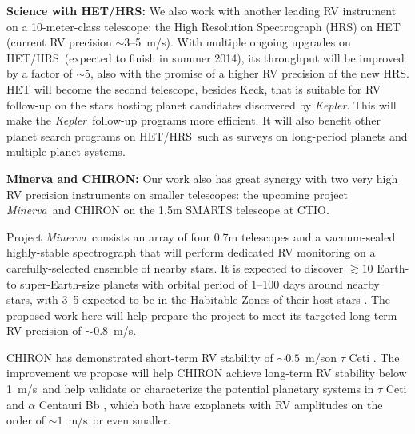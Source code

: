 \documentclass[12pt]{article}
\def\mps{m/s}
\def\kepler{{\it Kepler}}
\def\minerva{{\it Minerva}}
\def\hrs{HET/HRS}
\begin{document}
\textbf{Science with \hrs: } We also work with another leading RV
instrument on a 10-meter-class telescope: the High Resolution
Spectrograph (HRS) on HET (current RV precision $\sim$3--5~\mps). With
multiple ongoing upgrades on \hrs\ (expected to finish in summer
2014), its throughput will be improved by a factor of $\sim$5, also
with the promise of a higher RV precision of the new HRS. HET will
become the second telescope, besides Keck, that is suitable for RV
follow-up on the stars hosting planet candidates discovered by
\kepler. This will make the \kepler\ follow-up programs more
efficient. It will also benefit other planet search programs on
\hrs\ such as surveys on long-period planets and multiple-planet
systems.

\textbf{Minerva and CHIRON: } Our work also has great synergy with two
very high RV precision instruments on smaller telescopes: the upcoming
project \minerva\ and CHIRON on
the 1.5m SMARTS telescope at CTIO. 

Project \minerva\ consists an array of four 0.7m telescopes and a
vacuum-sealed highly-stable spectrograph that will perform dedicated
RV monitoring on a carefully-selected ensemble of nearby stars. It is
expected to discover $\gtrsim 10$ Earth- to super-Earth-size planets
with orbital period of 1--100 days around nearby stars, with 3--5
expected to be in the Habitable Zones of their host stars
\citep{bottom2013,hogstrom2013}. The proposed work here will help
prepare the project to meet its targeted long-term RV precision of
$\sim 0.8$~\mps.

CHIRON has demonstrated short-term RV stability of $\sim0.5$~\mps on
$\tau$ Ceti \citep{chiron2013}. The improvement we propose will help
CHIRON achieve long-term RV stability below 1~\mps\ and help validate
or characterize the potential planetary systems in $\tau$ Ceti
\citep{tuomi2013} and $\alpha$ Centauri Bb
\citep{dumusque2012,hatzes2013}, which both have exoplanets with RV
amplitudes on the order of $\sim 1$~\mps\ or even smaller.
\end{document}
